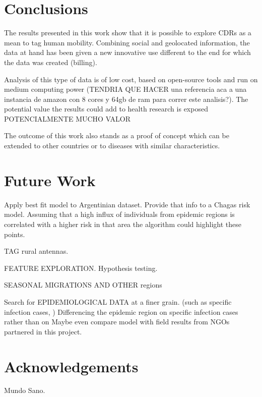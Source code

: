 \section{Conclusions}
The results presented in this work show that it is possible to explore CDRs as a mean to tag human mobility. Combining social and geolocated information, the data at hand has been given a new innovative use different to the end for which the data was created (billing).

Analysis of this type of data is of low cost, based on open-source tools and run on medium computing power (TENDRIA QUE HACER una referencia aca a una instancia de amazon con 8 cores y 64gb de ram para correr este analisis?). The potential value the results could add to health research is exposed
 POTENCIALMENTE MUCHO VALOR

The outcome of this work also stands as a proof of concept which can be extended to other countries or to diseases with similar characteristics.


\section{Future Work}
Apply best fit model to Argentinian dataset. Provide that info to a Chagas risk model. Assuming that a high influx of individuals from epidemic regions is correlated with a higher risk in that area the algorithm could highlight these points.

TAG rural antennas.

FEATURE EXPLORATION. Hypothesis testing. 

SEASONAL MIGRATIONS AND OTHER regions

Search for EPIDEMIOLOGICAL DATA at a finer grain. (such as specific infection cases, ) Differencing the epidemic region on specific infection cases rather than on
Maybe even compare model with field results from NGOs partnered in this project.

\section{Acknowledgements}
Mundo Sano.
